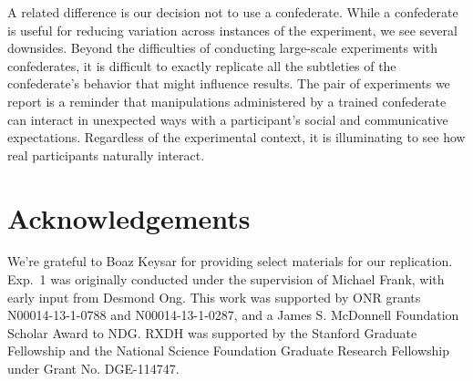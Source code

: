 \documentclass[10pt,letterpaper]{article}
\begin{document}
A related difference is our decision not to use a confederate. While a confederate is useful for reducing variation across instances of the experiment, we see several downsides. Beyond the difficulties of conducting large-scale experiments with confederates, it is difficult to exactly replicate all the subtleties of the confederate's behavior that might influence results. The pair of experiments we report is a reminder that manipulations administered by a trained confederate can interact in unexpected ways with a participant's social and communicative expectations. Regardless of the experimental context, it is illuminating to see how real participants naturally interact.

 

\section{Acknowledgements}

\small We're grateful to Boaz Keysar for providing select materials for our replication. Exp.~1 was originally conducted under the supervision of Michael Frank, with early input from Desmond Ong. This work was supported by ONR grants N00014-13-1-0788 and N00014-13-1-0287,  and a James S. McDonnell Foundation Scholar Award to NDG. RXDH was supported by the Stanford Graduate Fellowship and the National Science Foundation Graduate Research Fellowship under Grant No. DGE-114747. 



\setlength{\bibleftmargin}{.125in}
\setlength{\bibindent}{-\bibleftmargin}


\end{document}

